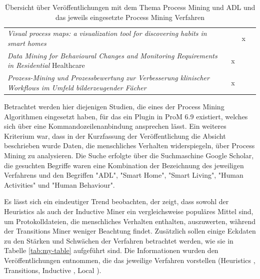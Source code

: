 \begin{table}[!ht]
\begin{tabularx}{\textwidth}{b ccc}
\textit{Visual process maps: a visualization tool for discovering habits in smart homes} \cite{adl9}                            &                                        & x                                      &                                         \\
\textit{Data Mining for Behavioural Changes and Monitoring Requirements in Residential} Healthcare \cite{adl10}                  & x                                      &                                        &                                         \\
\textit{Prozess-Mining und Prozessbewertung zur Verbesserung klinischer Workflows im Umfeld bilderzeugender Fächer} \cite{adl11} & x                                      &                                        &                                         \\ \hline

\end{tabularx}

\caption{Übersicht über Veröffentlichungen mit dem Thema Process Mining und ADL und das jeweils eingesetzte Process Mining Verfahren}
 \label{tab:miningPaper}
\end{table}
\normalsize
Betrachtet werden hier diejenigen Studien, die eines der Process Mining Algorithmen eingesetzt haben, für das ein Plugin in ProM 6.9 existiert, welches sich über eine Kommandozeilenanbindung ansprechen lässt. Ein weiteres Kriterium war, dass in der Kurzfassung der Veröffentlichung die Absicht beschrieben wurde Daten, die menschliches Verhalten widerspiegeln, über Process Mining zu analysieren. Die Suche erfolgte über die Suchmaschine Google Scholar, die gesuchten Begriffe waren eine Kombination der Bezeichnung des jeweiligen Verfahrens und den Begriffen "ADL", "Smart Home", "Smart Living", "Human Activities" und "Human Behaviour". 

Es lässt sich ein eindeutiger Trend beobachten, der zeigt, dass sowohl der Heuristics als auch der Inductive Miner ein vergleichsweise populäres Mittel sind, um Protokolldateien, die menschliches Verhalten enthalten, auszuwerten, während der Transitions Miner weniger Beachtung findet. Zusätzlich sollen einige Eckdaten zu den Stärken und Schwächen der Verfahren betrachtet werden, wie sie in Tabelle \ref{tab:my-table} aufgeführt sind. Die Informationen wurden den Veröffentlichungen entnommen, die das jeweilige Verfahren vorstellen (Heuristics \cite{heurMining}, Transitions\cite{transMiner}, Inductive \cite{inducIMining}, Local \cite{localMining}). 

